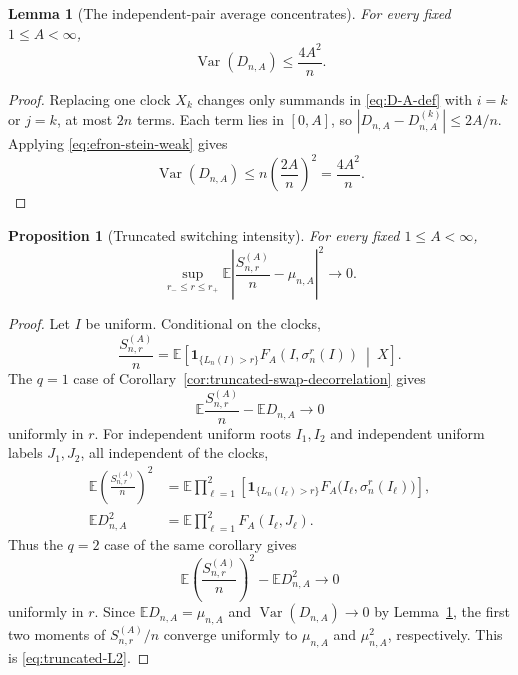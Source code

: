 \documentclass[11pt]{article}
\newcommand{\E}{\mathbb E}
\newcommand{\1}{\mathbf 1}
\newcommand{\Var}{\operatorname{Var}}
\newtheorem{proposition}[theorem]{Proposition}
\newtheorem{lemma}[theorem]{Lemma}
\theoremstyle{definition}
\theoremstyle{remark}
\begin{document}
\begin{lemma}[The independent-pair average concentrates]
\label{lem:D-concentration}
For every fixed $1\leq A<\infty$,
\begin{equation}\label{eq:D-variance}
  \Var(D_{n,A})\leq\frac{4A^2}{n}.
\end{equation}
\end{lemma}

\begin{proof}
Replacing one clock $X_k$ changes only summands in
\eqref{eq:D-A-def} with $i=k$ or $j=k$, at most $2n$ terms.  Each term
lies in $[0,A]$, so
$|D_{n,A}-D_{n,A}^{(k)}|\leq2A/n$.  Applying
\eqref{eq:efron-stein-weak} gives
\[
 \Var(D_{n,A})\leq n\left(\frac{2A}{n}\right)^2
 =\frac{4A^2}{n}.
\]
\end{proof}

\begin{proposition}[Truncated switching intensity]
\label{prop:truncated-intensity}
For every fixed $1\leq A<\infty$,
\begin{equation}\label{eq:truncated-L2}
 \sup_{r_-\leq r\leq r_+}
 \E\left|\frac{S_{n,r}^{(A)}}n-\mu_{n,A}\right|^2
 \longrightarrow0.
\end{equation}
\end{proposition}

\begin{proof}
Let $I$ be uniform.  Conditional on the clocks,
\[
 \frac{S_{n,r}^{(A)}}n
 =\E\left[
   \1_{\{L_n(I)>r\}}F_A(I,\sigma_n^r(I))
   \ \middle|\ X
 \right].
\]
The $q=1$ case of Corollary~\ref{cor:truncated-swap-decorrelation} gives
\[
  \E\frac{S_{n,r}^{(A)}}n-\E D_{n,A}\longrightarrow0
\]
uniformly in $r$.  For independent uniform roots $I_1,I_2$ and
independent uniform labels $J_1,J_2$, all independent of the clocks,
\begin{align*}
 \E\left(\frac{S_{n,r}^{(A)}}n\right)^2
 &=\E\prod_{\ell=1}^2
   \left[
    \1_{\{L_n(I_\ell)>r\}}
    F_A\bigl(I_\ell,\sigma_n^r(I_\ell)\bigr)
   \right],\\
 \E D_{n,A}^2
 &=\E\prod_{\ell=1}^2F_A(I_\ell,J_\ell).
\end{align*}
Thus the $q=2$ case of the same corollary gives
\[
  \E\left(\frac{S_{n,r}^{(A)}}n\right)^2
  -\E D_{n,A}^2\longrightarrow0
\]
uniformly in $r$.  Since $\E D_{n,A}=\mu_{n,A}$ and
$\Var(D_{n,A})\to0$ by Lemma~\ref{lem:D-concentration}, the first two
moments of $S_{n,r}^{(A)}/n$ converge uniformly to
$\mu_{n,A}$ and $\mu_{n,A}^2$, respectively.  This is
\eqref{eq:truncated-L2}.
\end{proof}
\end{document}

